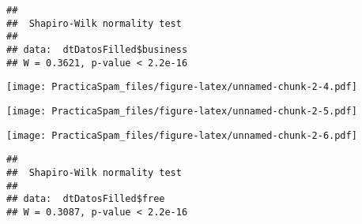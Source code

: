 \documentclass[
]{article}
\newenvironment{Shaded}{\begin{snugshade}}{\end{snugshade}}
\newcommand{\FunctionTok}[1]{\textcolor[rgb]{0.00,0.00,0.00}{#1}}
\newcommand{\NormalTok}[1]{#1}
\newcommand{\SpecialCharTok}[1]{\textcolor[rgb]{0.00,0.00,0.00}{#1}}
\begin{document}
\begin{verbatim}
## 
##  Shapiro-Wilk normality test
## 
## data:  dtDatosFilled$business
## W = 0.3621, p-value < 2.2e-16
\end{verbatim}

\begin{Shaded}
\end{Shaded}

\texttt{[image: PracticaSpam\_files/figure-latex/unnamed-chunk-2-4.pdf]}

\begin{Shaded}
\end{Shaded}

\texttt{[image: PracticaSpam\_files/figure-latex/unnamed-chunk-2-5.pdf]}

\begin{Shaded}
\end{Shaded}

\texttt{[image: PracticaSpam\_files/figure-latex/unnamed-chunk-2-6.pdf]}

\begin{Shaded}
\end{Shaded}

\begin{verbatim}
## 
##  Shapiro-Wilk normality test
## 
## data:  dtDatosFilled$free
## W = 0.3087, p-value < 2.2e-16
\end{verbatim}

\begin{Shaded}
\end{Shaded}
\end{document}
